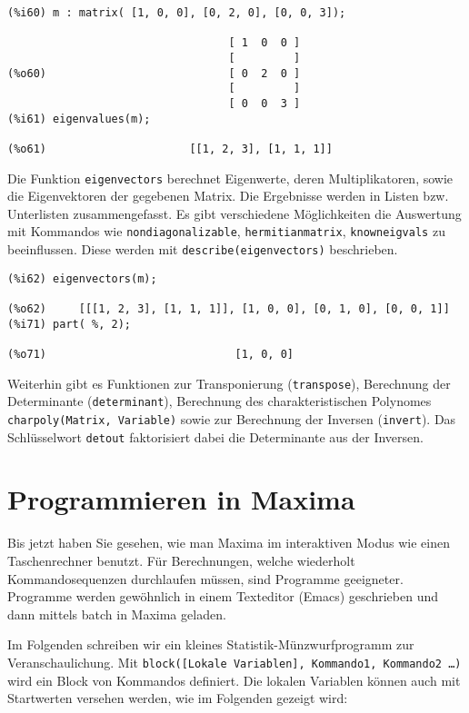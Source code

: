 \documentclass[ngerman,12pt]{scrartcl}
\begin{document}
\begin{verbatim}
(%i60) m : matrix( [1, 0, 0], [0, 2, 0], [0, 0, 3]);

                                  [ 1  0  0 ]
                                  [         ]
(%o60)                            [ 0  2  0 ]
                                  [         ]
                                  [ 0  0  3 ]
(%i61) eigenvalues(m);

(%o61)                      [[1, 2, 3], [1, 1, 1]]
\end{verbatim}

Die Funktion \texttt{eigenvectors} berechnet Eigenwerte, deren
Multiplikatoren, sowie die Eigenvektoren der gegebenen Matrix. Die
Ergebnisse werden in Listen bzw. Unterlisten zusammengefasst. Es gibt
verschiedene Möglichkeiten die Auswertung mit Kommandos wie
\texttt{nondiagonalizable}, \texttt{hermitianmatrix},
\texttt{knowneigvals} zu beeinflussen. Diese werden mit
\texttt{describe(eigenvectors)} beschrieben.

\begin{verbatim}
(%i62) eigenvectors(m);

(%o62)     [[[1, 2, 3], [1, 1, 1]], [1, 0, 0], [0, 1, 0], [0, 0, 1]]
(%i71) part( %, 2);

(%o71)                             [1, 0, 0]
\end{verbatim}

Weiterhin gibt es Funktionen zur Transponierung (\texttt{transpose}),
Berechnung der Determinante (\texttt{determinant}), Berechnung  des
charakteristischen Polynomes \texttt{charpoly(Matrix, Variable)} sowie
zur Berechnung der Inversen (\texttt{invert}). Das  Schlüsselwort
\texttt{detout} faktorisiert  dabei die Determinante aus der Inversen.

\section{Programmieren in Maxima}

Bis jetzt haben Sie gesehen, wie man Maxima im interaktiven Modus wie
einen Taschenrechner benutzt. Für Berechnungen, welche wiederholt
Kommandosequenzen durchlaufen müssen, sind Programme geeigneter.
Programme werden gewöhnlich in einem Texteditor (Emacs) geschrieben
und dann mittels batch in Maxima geladen.

Im Folgenden schreiben wir ein kleines Statistik-Münzwurfprogramm zur
Veranschaulichung. Mit \texttt{block([Lokale Variablen], Kommando1,  Kommando2 \ldots)} wird
ein Block von Kommandos  definiert. Die lokalen Variablen können auch
mit Startwerten versehen werden, wie im Folgenden gezeigt wird:
\end{document}
